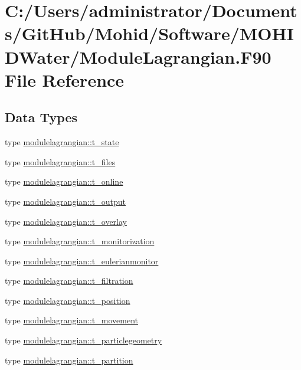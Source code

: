 \hypertarget{_module_lagrangian_8_f90}{}\section{C\+:/\+Users/administrator/\+Documents/\+Git\+Hub/\+Mohid/\+Software/\+M\+O\+H\+I\+D\+Water/\+Module\+Lagrangian.F90 File Reference}
\label{_module_lagrangian_8_f90}
\subsection*{Data Types}
\begin{DoxyCompactItemize}
\item 
type \mbox{\hyperlink{structmodulelagrangian_1_1t__state}{modulelagrangian\+::t\+\_\+state}}
\item 
type \mbox{\hyperlink{structmodulelagrangian_1_1t__files}{modulelagrangian\+::t\+\_\+files}}
\item 
type \mbox{\hyperlink{structmodulelagrangian_1_1t__online}{modulelagrangian\+::t\+\_\+online}}
\item 
type \mbox{\hyperlink{structmodulelagrangian_1_1t__output}{modulelagrangian\+::t\+\_\+output}}
\item 
type \mbox{\hyperlink{structmodulelagrangian_1_1t__overlay}{modulelagrangian\+::t\+\_\+overlay}}
\item 
type \mbox{\hyperlink{structmodulelagrangian_1_1t__monitorization}{modulelagrangian\+::t\+\_\+monitorization}}
\item 
type \mbox{\hyperlink{structmodulelagrangian_1_1t__eulerianmonitor}{modulelagrangian\+::t\+\_\+eulerianmonitor}}
\item 
type \mbox{\hyperlink{structmodulelagrangian_1_1t__filtration}{modulelagrangian\+::t\+\_\+filtration}}
\item 
type \mbox{\hyperlink{structmodulelagrangian_1_1t__position}{modulelagrangian\+::t\+\_\+position}}
\item 
type \mbox{\hyperlink{structmodulelagrangian_1_1t__movement}{modulelagrangian\+::t\+\_\+movement}}
\item 
type \mbox{\hyperlink{structmodulelagrangian_1_1t__particlegeometry}{modulelagrangian\+::t\+\_\+particlegeometry}}
\item 
type \mbox{\hyperlink{structmodulelagrangian_1_1t__partition}{modulelagrangian\+::t\+\_\+partition}}

\end{DoxyCompactItemize}
